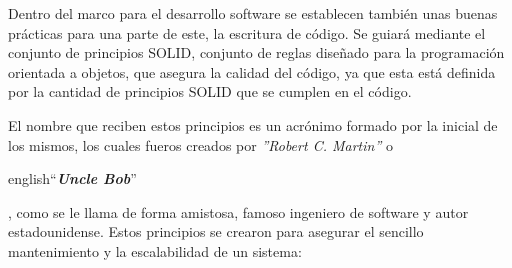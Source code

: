 Dentro del marco para el desarrollo software se establecen también unas buenas prácticas para una parte de este, la 
escritura de código. Se guiará mediante el conjunto de principios SOLID\cite{martinFunctional}, conjunto de reglas 
diseñado para la programación orientada a objetos, que asegura la calidad del código, ya que esta está definida por la 
cantidad de principios SOLID que se cumplen en el código. 

El nombre que reciben estos principios es un acrónimo formado por la inicial de los mismos, los cuales fueros creados por \textit{''Robert C. Martin''}\cite{UncleBob} o \begin{otherlanguage} {english}``\textit{\textbf{Uncle Bob}}''\end{otherlanguage}, como se le llama de forma amistosa, famoso ingeniero de software y autor 
estadounidense. Estos principios se crearon para asegurar el sencillo mantenimiento y la escalabilidad de un sistema:

